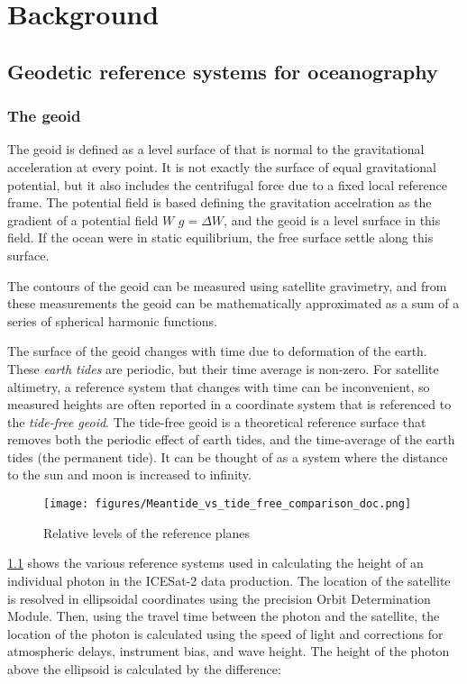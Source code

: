 \chapter{Background}
\section{Geodetic reference systems for oceanography}
\subsection{The geoid}
The geoid is defined as a level surface of that is normal to the gravitational acceleration at every point. It is not exactly the surface of equal gravitational potential, but it also includes the centrifugal force due to a fixed local reference frame. The potential field is based defining the gravitation accelration as the gradient of a potential field $W$ $g=\Delta W$, and the geoid is a level surface in this field. If the ocean were in static equilibrium, the free surface settle along this surface.

The contours of the geoid can be measured using satellite gravimetry, and from these measurements the geoid can be mathematically approximated as a sum of a series of spherical harmonic functions.

The surface of the geoid changes with time due to deformation of the earth. These \emph{earth tides} are periodic, but their time average is non-zero. For satellite altimetry, a reference system that changes with time can be inconvenient, so measured heights are often reported in a coordinate system that is referenced to the \emph{tide-free geoid}. The tide-free geoid is a theoretical reference surface that removes both the periodic effect of earth tides, and the time-average of the earth tides (the permanent tide). It can be thought of as a system where the distance to the sun and moon is increased to infinity.

\begin{figure}[h]
      \centering
      \texttt{[image: figures/Meantide\_vs\_tide\_free\_comparison\_doc.png]}
      \caption{Relative levels of the reference planes}
      \label{fig:geoids-ellipsoids-graphics}
\end{figure}

\ref{fig:geoids-ellipsoids-graphics} shows the various reference systems used in calculating the height of an individual photon in the ICESat-2 data production. The location of the satellite is resolved in ellipsoidal coordinates using the precision Orbit Determination Module. Then, using the travel time between the photon and the satellite, the location of the photon is calculated using the speed of light and corrections for atmospheric delays, instrument bias, and wave height. The height of the photon above the ellipsoid is calculated by the difference:


